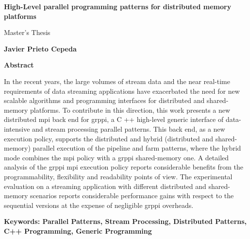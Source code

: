% 
% 
%

\thispagestyle{plain}



\begin{center}
    \Large
    \textbf{High-Level parallel programming patterns for distributed memory platforms}
    
    
    \vspace{0.4cm}
    \large
    Master's Thesis
    
    \vspace{0.4cm}
    \textbf{Javier Prieto Cepeda}
    
    \vspace{0.9cm}
    \textbf{Abstract}
\end{center}

In the recent years, the large volumes of stream data and the near real-time requirements of data streaming applications have exacerbated the need for new scalable algorithms and programming interfaces for distributed and shared-memory platforms. To contribute in this direction, this work presents a new distributed \acrshort{mpi} back end for \acrshort{grppi}, a C ++ high-level generic interface of data-intensive and stream processing parallel patterns. This back end, as a new execution policy, supports the distributed and hybrid (distributed and shared-memory) parallel execution of the pipeline and farm patterns, where the hybrid mode combines the \acrshort{mpi} policy with a \acrshort{grppi} shared-memory one. %
A detailed analysis of the \acrshort{grppi} \acrshort{mpi} execution policy reports considerable benefits from the programmability, flexibility and readability points of view. The experimental evaluation on a streaming application with different distributed and shared-memory scenarios reports considerable performance gains with respect to the sequential versions at the expense of negligible \acrshort{grppi} overheads.


\vspace{0.7cm}

\textbf{Keywords: Parallel Patterns, Stream Processing, Distributed Patterns, C++ Programming, Generic Programming} 

\afterpage{\blankpage} %
\clearpage